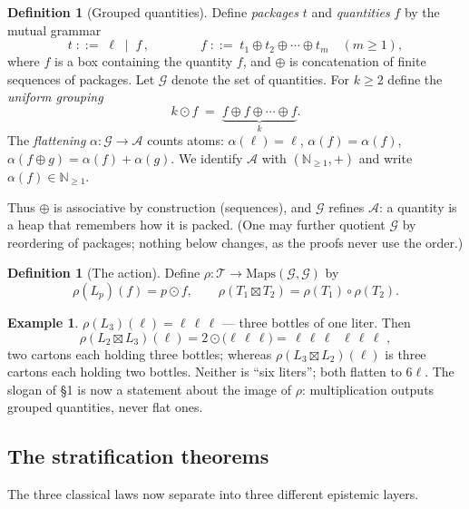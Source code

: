 \documentclass[11pt]{article}
\newcommand{\cT}{\mathcal{T}}   %
\newcommand{\cG}{\mathcal{G}}   %
\newcommand{\cA}{\mathcal{A}}   %
\newcommand{\NN}{\mathbb{N}}
\newcommand{\pkg}[1]{\boxed{#1}}
\newcommand{\act}{\rho}
\numberwithin{equation}{section}
\theoremstyle{plain}
\theoremstyle{definition}
\newtheorem{definition}[theorem]{Definition}
\newtheorem{example}[theorem]{Example}
\theoremstyle{remark}
\begin{document}
\begin{definition}[Grouped quantities]\label{def:grouped}
Define \emph{packages} $t$ and \emph{quantities} $f$ by the mutual grammar
\[
t \;::=\; \ell \;\mid\; \pkg{f}\,,
\qquad\qquad
f \;::=\; t_1 \oplus t_2 \oplus \cdots \oplus t_m \quad (m \ge 1),
\]
where $\pkg{f}$ is a box containing the quantity $f$, and $\oplus$ is concatenation of
finite sequences of packages. Let $\cG$ denote the set of quantities. For $k \ge 2$
define the \emph{uniform grouping}
\[
k \odot f \;=\; \underbrace{\pkg{f} \oplus \pkg{f} \oplus \cdots \oplus \pkg{f}}_{k}.
\]
The \emph{flattening} $\alpha \colon \cG \to \cA$ counts atoms:
$\alpha(\ell) = \ell$, $\alpha(\pkg f) = \alpha(f)$,
$\alpha(f \oplus g) = \alpha(f) + \alpha(g)$. We identify $\cA$ with
$(\NN_{\ge1}, +)$ and write $\alpha(f) \in \NN_{\ge 1}$.
\end{definition}

Thus $\oplus$ is associative by construction (sequences), and $\cG$ refines $\cA$: a
quantity is a heap that remembers how it is packed. (One may further quotient $\cG$ by
reordering of packages; nothing below changes, as the proofs never use the order.)

\begin{definition}[The action]\label{def:action}
Define $\act \colon \cT \to \mathrm{Maps}(\cG, \cG)$ by
\[
\act(L_p)(f) = p \odot f,
\qquad
\act(T_1 \boxtimes T_2) = \act(T_1) \circ \act(T_2).
\]
\end{definition}

\begin{example}\label{ex:liters}
$\act(L_3)(\ell) = \pkg{\ell}\,\pkg{\ell}\,\pkg{\ell}$ --- three bottles of one liter.
Then
\[
\act(L_2 \boxtimes L_3)(\ell)
= 2 \odot \bigl(\pkg{\ell}\,\pkg{\ell}\,\pkg{\ell}\bigr)
= \pkg{\,\pkg{\ell}\,\pkg{\ell}\,\pkg{\ell}\,}\;\pkg{\,\pkg{\ell}\,\pkg{\ell}\,\pkg{\ell}\,}\,,
\]
two cartons each holding three bottles; whereas $\act(L_3 \boxtimes L_2)(\ell)$ is three
cartons each holding two bottles. Neither is ``six liters''; both flatten to
$6\ell$. The slogan of \S1 is now a statement about the image of $\act$: multiplication
outputs grouped quantities, never flat ones.
\end{example}

\subsection{The stratification theorems}

The three classical laws now separate into three different epistemic layers.
\end{document}
